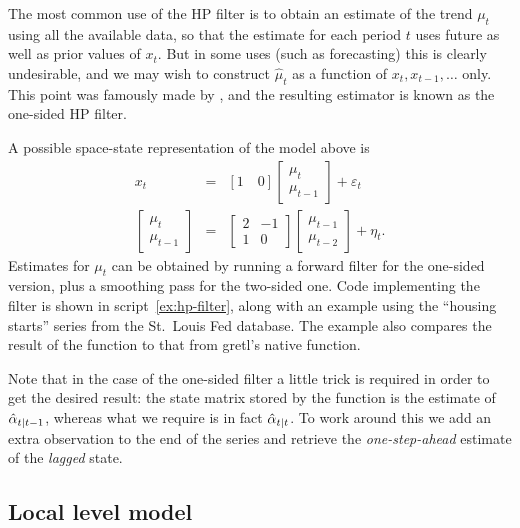The most common use of the HP filter is to obtain an estimate of the
trend $\mu_t$ using all the available data, so that the estimate for
each period $t$ uses future as well as prior values of $x_t$. But in
some uses (such as forecasting) this is clearly undesirable, and we
may wish to construct $\hat{\mu}_t$ as a function of
$x_t, x_{t-1}, \ldots$ only. This point was famously made by
\cite{stock-watson1999}, and the resulting estimator is known as the
one-sided HP filter.

A possible space-state representation of the model above is
\begin{eqnarray*}
  x_t & = & [1 \quad 0]
            \left[ \begin{array}{c} \mu_t \\ \mu_{t-1}\end{array}\right]
  + \varepsilon_t \\
  \left[ \begin{array}{c} \mu_t \\ \mu_{t-1}\end{array}\right] & = &
  \left[ \begin{array}{rr} 2 & -1 \\ 1 & 0 \end{array}\right]
  \left[ \begin{array}{c} \mu_{t-1} \\ \mu_{t-2}\end{array}\right] +
  \eta_t .
\end{eqnarray*}
Estimates for $\mu_t$ can be obtained by running a forward filter for
the one-sided version, plus a smoothing pass for the two-sided
one. Code implementing the filter is shown in script~\ref{ex:hp-filter},
along with an example using the ``housing starts'' series from the
St.~Louis Fed database. The example also compares the result of the
function to that from gretl's native  function.

Note that in the case of the one-sided filter a little trick is
required in order to get the desired result: the state matrix stored
by the  function is the estimate of
$\hat{\alpha}_{t|t-1}$, whereas what we require is in fact
$\hat{\alpha}_{t|t}$. To work around this we add an extra
observation to the end of the series and retrieve the
\emph{one-step-ahead} estimate of the \emph{lagged} state.

\subsection{Local level model}
\label{sec:example_loclev}


